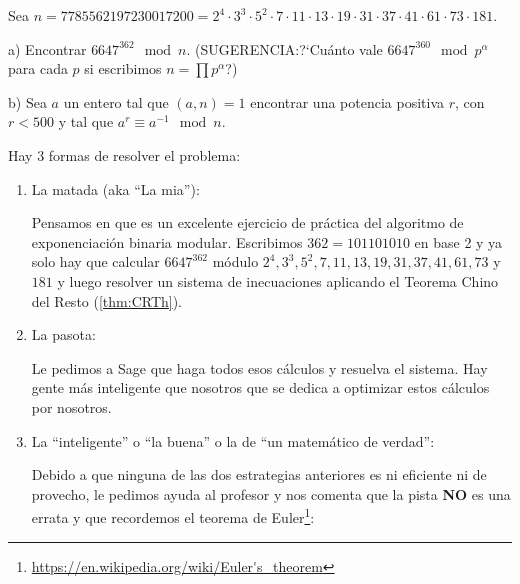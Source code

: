 




\begin{problem} [9]
Sea
$n=7785562197230017200=2^4\cdot3^3\cdot5^2\cdot7\cdot11\cdot13\cdot19\cdot31
\cdot37\cdot41\cdot61\cdot73\cdot181$.

a) Encontrar $6647^{362}\mod n$. (SUGERENCIA:?`Cuánto vale $6647^{360}\mod
p^{\alpha}$ para cada $p$ si escribimos $n=\prod p^{\alpha}$?)

b) Sea $a$ un entero tal que $(a,n)=1$ encontrar una potencia positiva $r$,
con $r<500$ y tal que $a^r\equiv a^{-1}\mod n$.

\solution


\spart
Hay 3 formas de resolver el problema:

\begin{enumerate}
\item La matada (aka ``La mia''):

Pensamos en que es un excelente ejercicio de práctica del algoritmo de exponenciación binaria modular. Escribimos $362 = 101101010$ en base 2 y ya solo hay que calcular $6647^{362}$ módulo $2^4,3^3,5^2,7,11,13,19,31,37,41,61,73$ y $181$ y luego resolver un sistema de inecuaciones aplicando el Teorema Chino del Resto (\ref{thm:CRTh}).

\item La pasota:

Le pedimos a Sage que haga todos esos cálculos y resuelva el sistema. Hay gente más inteligente que nosotros que se dedica a optimizar estos cálculos por nosotros.

\item La ``inteligente'' o ``la buena'' o la de ``un matemático de verdad'':

Debido a que ninguna de las dos estrategias anteriores es ni eficiente ni de provecho, le pedimos ayuda al profesor y nos comenta que la pista {\bf NO} es una errata y que recordemos el teorema de Euler\footnote{\url{https://en.wikipedia.org/wiki/Euler's_theorem}}:


\end{enumerate}
\end{problem}
